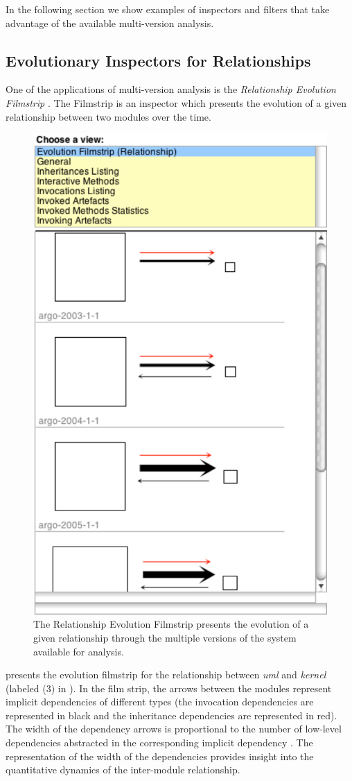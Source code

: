 \documentclass[preprint,12pt]{elsarticle}
\newcommand{\cd}[1]{{\em{#1}}}
\begin{document}
In the following section we show examples of inspectors and filters that take advantage of the available multi-version analysis. 


\subsection {Evolutionary Inspectors for Relationships}


One of the applications of multi-version analysis is the {\em Relationship Evolution Filmstrip} \cite{lungu-relevo}. The Filmstrip is an inspector which presents the evolution of a given relationship between two modules over the time. 


\begin{figure}[ht!]
\begin{center}
\includegraphics[width=0.35\linewidth]{Filmstrip}
\caption{The Relationship Evolution Filmstrip presents the evolution of a given relationship through the multiple versions of the system available for analysis.}
\end{center}
\end{figure}

 presents the evolution filmstrip for the relationship between \cd{uml} and \cd{kernel} (labeled (3) in ). In the film strip, the arrows between the modules represent implicit dependencies of different types (the invocation dependencies are represented in black and the inheritance dependencies are represented in red). The width of the dependency arrows is proportional to the number of low-level dependencies abstracted in the corresponding implicit dependency \cite{lungu-relevo}. The representation of the width of the dependencies provides insight into the quantitative dynamics of the inter-module relationship.
\end{document}
